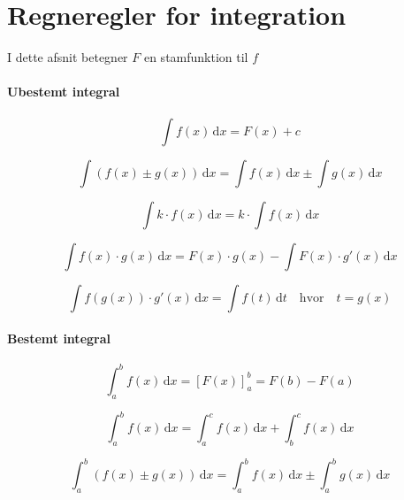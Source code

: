 \documentclass[11pt,a4paper,landscape,twocolumn,fleqn,leqno]{article}
\begin{document}
\section{Regneregler for integration}

I dette afsnit betegner $F$ en stamfunktion til $f$

\paragraph{Ubestemt integral}

\begin{equation}
\int f(x)\, \mathrm{d}x = F(x) + c
\end{equation}

\begin{equation}
\int \left(f(x) \pm g(x)\right)\, \mathrm{d}x = \int f(x)\, \mathrm{d}x \pm \int g(x)\, \mathrm{d}x
\end{equation}

\begin{equation}
\int k \cdot f(x)\, \mathrm{d}x = k \cdot \int f(x)\, \mathrm{d}x
\end{equation}

\begin{equation}
\int f(x) \cdot g(x)\, \mathrm{d}x = F(x) \cdot g(x) -  \int F(x) \cdot g'(x)\, \mathrm{d}x
\end{equation}

\begin{equation}
\int f(g(x)) \cdot g'(x)\, \mathrm{d}x = \int f(t)\, \mathrm{d}t \quad \mbox{hvor} \quad t = g(x)
\end{equation}

\paragraph{Bestemt integral}

\begin{equation}
\int_a^b f(x)\, \mathrm{d}x = \left[F(x)\right]_a^b = F(b) - F(a)
\end{equation}

\begin{equation}
\int_a^b f(x)\, \mathrm{d}x = \int_a^c f(x)\, \mathrm{d}x + \int_b^c f(x)\, \mathrm{d}x
\end{equation}

\begin{equation}
\int_a^b \left(f(x) \pm g(x)\right)\, \mathrm{d}x = \int_a^b f(x)\, \mathrm{d}x \pm \int_a^b g(x)\, \mathrm{d}x
\end{equation}
\end{document}
